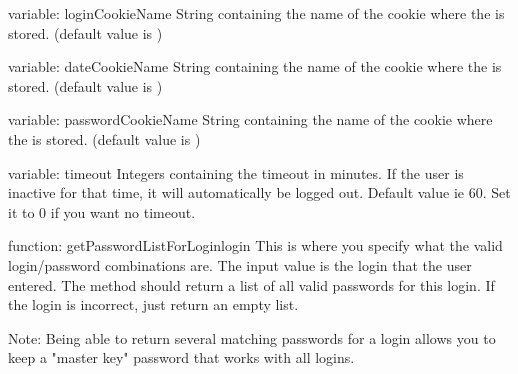 \begin{memberdesc}{variable: loginCookieName}
String containing the name of the cookie where the  is stored. (default value is )
\end{memberdesc}
\begin{memberdesc}{variable: dateCookieName}
String containing the name of the cookie where the  is stored. (default value is )
\end{memberdesc}
\begin{memberdesc}{variable: passwordCookieName}
String containing the name of the cookie where the  is stored. (default value is )
\end{memberdesc}
\begin{memberdesc}{variable: timeout}
Integers containing the timeout in minutes. If the user is inactive for that time, it will
automatically be logged out. Default value ie 60. Set it to 0 if you want no timeout.
\end{memberdesc}

\begin{funcdesc}{function: getPasswordListForLogin}{login}
This is where you specify what the valid login/password combinations are. The input value is the login that the
user entered. The method should return a list of all valid passwords for this login. If the login is incorrect, just
return an empty list.

Note: Being able to return several matching passwords for a login allows you to keep a "master key" password that works 
with all logins.
\end{funcdesc}

